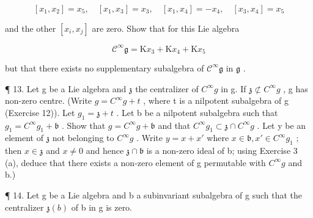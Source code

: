 \[
\left[ x _ {1}, x _ {2} \right] = x _ {5}, \quad \left[ x _ {1}, x _ {3} \right] = x _ {3}, \quad \left[ x _ {1}, x _ {4} \right] = - x _ {4}, \quad \left[ x _ {3}, x _ {4} \right] = x _ {5}
\]

and the other \([x_i, x_j]\) are zero. Show that for this Lie algebra

\[
\mathcal {C} ^ {\infty} \mathfrak {g} = \mathrm{K} x _ {3} + \mathrm{K} x _ {4} + \mathrm{K} x _ {5}
\]

but that there exists no supplementary subalgebra of \(\mathcal{C}^{\infty}\mathfrak{g}\) in \(\mathfrak{g}\) .

¶ 13. Let g be a Lie algebra and \(\mathfrak{z}\) the centralizer of \(C^{\infty}g\) in g. If \(\mathfrak{z} \not\subset C^{\infty}g\) , g has non-zero centre. (Write \(g = C^{\infty}g + t\) , where t is a nilpotent subalgebra of g (Exercise 12)). Let \(g_{1} = \mathfrak{z} + t\) . Let b be a nilpotent subalgebra such that \(g_{1} = C^{\infty}g_{1} + \mathfrak{b}\) . Show that \(g = C^{\infty}g + \mathfrak{b}\) and that \(C^{\infty}g_{1} \subset \mathfrak{z} \cap C^{\infty}g\) . Let y be an element of \(\mathfrak{z}\) not belonging to \(C^{\infty}g\) . Write \(y = x + x'\) where \(x \in \mathfrak{b}, x' \in C^{\infty}g_{1}\) ; then \(x \in \mathfrak{z}\) and \(x \neq 0\) and hence \(\mathfrak{z} \cap \mathfrak{b}\) is a non-zero ideal of b; using Exercise 3 (a), deduce that there exists a non-zero element of g permutable with \(C^{\infty}g\) and b.)

¶ 14. Let g be a Lie algebra and b a subinvariant subalgebra of g such that the centralizer \(\mathfrak{z}(b)\) of b in g is zero.

